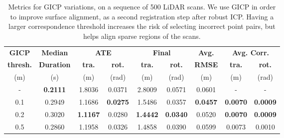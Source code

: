 \begin{table}[h]
    \centering
    {\small
        \begin{tabular}{c|c|cc|cc|c|cc}
            \hline
            \textbf{GICP}    & \textbf{Median}   & \multicolumn{2}{c|}{ \textbf{ATE}} & \multicolumn{2}{c|}{ \textbf{Final}} & \textbf{Avg.}   & \multicolumn{2}{c}{ \textbf{Avg. Corr.}}                                                       \\
            \textbf{thresh.} & \textbf{Duration} & \textbf{tra.}                      & \textbf{rot.}                        & \textbf{tra.}   & \textbf{rot.}                            & \textbf{RMSE}   & \textbf{tra.}   & \textbf{rot.}   \\
            (m)              & (s)               & (m)                                & (rad)                                & (m)             & (rad)                                    & (m)             & (m)             & (rad)           \\
            \hline
            \hline
            -                & \textbf{0.2111}   & 1.8036                             & 0.0371                               & 2.8009          & 0.0571                                   & 0.0601          & -               & -               \\
            0.1              & 0.2949            & 1.1686                             & \textbf{0.0275}                      & 1.5486          & 0.0357                                   & \textbf{0.0457} & \textbf{0.0070} & \textbf{0.0009} \\
            0.2              & 0.3020            & \textbf{1.1167}                    & 0.0280                               & \textbf{1.4442} & \textbf{0.0340}                          & 0.0520          & \textbf{0.0070} & \textbf{0.0009} \\
            0.5              & 0.2860            & 1.1958                             & 0.0326                               & 1.4858          & 0.0390                                   & 0.0599          & 0.0073          & 0.0010          \\
            \hline
        \end{tabular}
    }
    \caption{Metrics for GICP variations, on a sequence of 500 LiDAR scans. We use GICP in order to improve surface alignment, as a second registration step after robust ICP. Having a larger correspondence threshold increases the risk of selecting incorrect point pairs, but helps align sparse regions of the scans.}
    \label{tab:gicp_variations}
\end{table}


